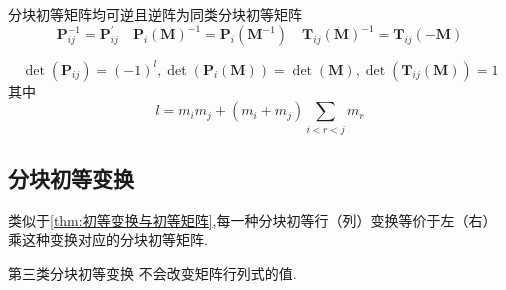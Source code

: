 \begin{formal}
\begin{theorem}[分块初等矩阵的逆阵]\label{thm:分块初等矩阵的逆阵}
分块初等矩阵均可逆且逆阵为同类分块初等矩阵
\[
\bm{P}_{ij}^{-1} = \bm{P}_{ij}^{\prime} \quad
\bm{P}_i\left(\bm{M}\right)^{-1}
=\bm{P}_i\left(\bm{M}^{-1}\right) \quad
\bm{T}_{ij}\left(\bm{M}\right)^{-1}
= \bm{T}_{ij}\left(-\bm{M}\right)
\]
\end{theorem}
\end{formal}
\begin{formal}
\begin{theorem}[分块初等矩阵的行列式]\label{thm:分块初等矩阵的行列式}
\[
 \det\left(\bm{P}_{ij}\right) = \left(-1
\right)^l, \det\left(\bm{P}_i\left(\bm{M}\right)\right)
=  \det\left(\bm{M}\right),
 \det\left(\bm{T}_{ij}\left(\bm{M}
\right)\right) = 1
\]
其中
\[
l = m_i m_j + \left(m_i + m_j\right)
\sum_{i < r <j}m_r
\]
\end{theorem}
\end{formal}
\subsection{分块初等变换}
\begin{formal}\begin{theorem}[分块初等变换与分块初等矩阵]\label{thm:分块初等变换与分块初等矩阵}
    类似于\cref{thm:初等变换与初等矩阵},每一种分块初等行（列）变换等价于左（右）
乘这种变换对应的分块初等矩阵.
\end{theorem}\end{formal}
\begin{green}
\begin{corollary}[分块初等变换与行列式]\label{cor:分块初等变换与行列式}
    第三类分块初等变换
不会改变矩阵行列式的值.
\end{corollary}
\end{green}
